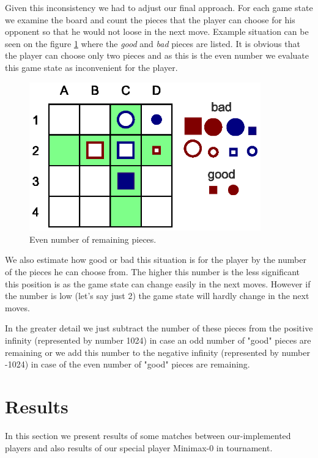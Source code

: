 \documentclass[paper=a4, fontsize=11pt]{article} %
\begin{document}
Given this inconsistency we had to adjust our final approach. For each game state we examine the board and count the pieces that the player can choose for his opponent so that he would not loose in the next move. Example situation can be seen on the figure \ref{fig:even} where the \textit{good} and \textit{bad} pieces are listed. It is obvious that the player can choose only two pieces and as this is the even number we evaluate this game state as inconvenient for the player.


\begin{figure}[!htb]
	\centering
		\includegraphics[width=10cm]{img/eval_func_even.eps}
	\caption{Even number of remaining pieces.}
	\label{fig:even}
\end{figure}

We also estimate how good or bad this situation is for the player by the number of the pieces he can choose from. The higher this number is the less significant this position is as the game state can change easily in the next moves. However if the number is low (let's say just 2) the game state will hardly change in the next moves.

In the greater detail we just subtract the number of these pieces from the positive infinity (represented by number 1024) in case an odd number of "good" pieces are remaining or we add this number to the negative infinity (represented by number -1024) in case of the even number of "good" pieces are remaining.








\section{Results}

In this section we present results of some matches between our-implemented players and also results of our special player Minimax-0 in tournament.
\end{document}
